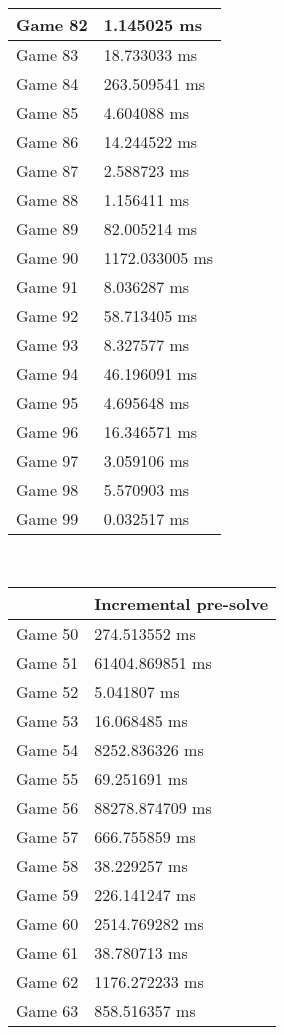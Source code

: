 \begin{multicols}{2}
\begin{tabular}{|l|l|}
	Game 82 & 1.145025 ms \\ \hline
	Game 83 & 18.733033 ms \\ \hline
	Game 84 & 263.509541 ms \\ \hline
	Game 85 & 4.604088 ms \\ \hline
	Game 86 & 14.244522 ms \\ \hline
	Game 87 & 2.588723 ms \\ \hline
	Game 88 & 1.156411 ms \\ \hline
	Game 89 & 82.005214 ms \\ \hline
	Game 90 & 1172.033005 ms \\ \hline
	Game 91 & 8.036287 ms \\ \hline
	Game 92 & 58.713405 ms \\ \hline
	Game 93 & 8.327577 ms \\ \hline
	Game 94 & 46.196091 ms \\ \hline
	Game 95 & 4.695648 ms \\ \hline
	Game 96 & 16.346571 ms \\ \hline
	Game 97 & 3.059106 ms \\ \hline
	Game 98 & 5.570903 ms \\ \hline
	Game 99 & 0.032517 ms \\ \hline
\end{tabular}\\
\begin{tabular}{|l|l|}
	\hline
	& Incremental pre-solve \\ \hline
	Game 50 & 274.513552 ms \\ \hline
	Game 51 & 61404.869851 ms \\ \hline
	Game 52 & 5.041807 ms \\ \hline
	Game 53 & 16.068485 ms \\ \hline
	Game 54 & 8252.836326 ms \\ \hline
	Game 55 & 69.251691 ms \\ \hline
	Game 56 & 88278.874709 ms \\ \hline
	Game 57 & 666.755859 ms \\ \hline
	Game 58 & 38.229257 ms \\ \hline
	Game 59 & 226.141247 ms \\ \hline
	Game 60 & 2514.769282 ms \\ \hline
	Game 61 & 38.780713 ms \\ \hline
	Game 62 & 1176.272233 ms \\ \hline
	Game 63 & 858.516357 ms \\ \hline

\end{tabular}
\end{multicols}
